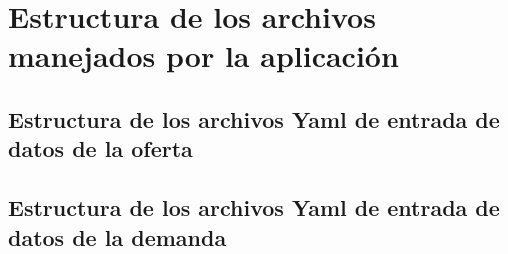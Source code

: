 \chapter{Estructura de los archivos manejados por la aplicación}
\label{ch:yamlApendix}

\section{Estructura de los archivos Yaml de entrada de datos de la oferta}

                   
\section{Estructura de los archivos Yaml de entrada de datos de la demanda}
